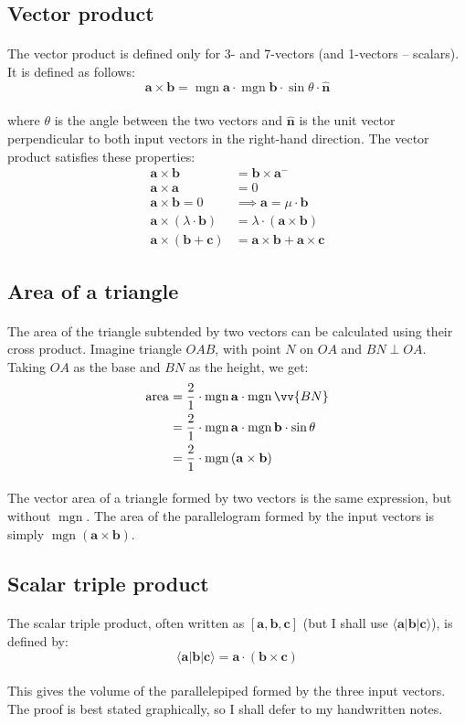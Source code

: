\documentclass[11pt]{article}
\newcommand*\cd{\cdot}
\newcommand*\prg{\paragraph}
\DeclareMathOperator{\mgn}{mgn}
\begin{document}
\subsection{Vector product}
\prg{}The vector product is defined only for 3- and 7-vectors (and 1-vectors -- scalars). It is defined as follows:
\[
\mathbf a\times\mathbf b=\mgn{\mathbf a}\cd\mgn{\mathbf b}\cd\sin\theta\cd\mathbf{\hat n}
\]
\prg{}where $\theta$ is the angle between the two vectors and $\mathbf{\hat n}$ is the unit vector perpendicular to both input vectors in the right-hand direction. The vector product satisfies these properties:
\[
\begin{aligned}
\mathbf a\times\mathbf b&=\mathbf b\times\mathbf a^-\\
\mathbf a\times\mathbf a&=0\\
\mathbf a\times\mathbf b=0&\implies\mathbf a=\mu\cd\mathbf b\\
\mathbf a\times(\lambda\cd\mathbf b)&=\lambda\cd(\mathbf a\times\mathbf b)\\
\mathbf a\times(\mathbf b+\mathbf c)&=\mathbf a\times\mathbf b+\mathbf a\times\mathbf c
\end{aligned}
\]

\subsection{Area of a triangle}
\prg{}The area of the triangle subtended by two vectors can be calculated using their cross product. Imagine triangle $OAB$, with point $N$ on $OA$ and $BN\perp OA$. Taking $OA$ as the base and $BN$ as the height, we get:
\[
\begin{aligned}
\mathrm{area}&=\frac 21\cd\mgn{\mathbf a}\cd\mgn{\vv{BN}}\\
&=\frac 21\cd\mgn{\mathbf a}\cd\mgn{\mathbf b}\cd\sin\theta\\
&=\frac 21\cd\mgn{(\mathbf a\times\mathbf b)}\\
\end{aligned}
\]
\prg{}The vector area of a triangle formed by two vectors is the same expression, but without $\mgn$. The area of the parallelogram formed by the input vectors is simply $\mgn{(\mathbf a\times\mathbf b)}$.

\subsection{Scalar triple product}
\prg{}The scalar triple product, often written as $[\mathbf a,\mathbf b,\mathbf c]$ (but I shall use $\langle\mathbf a|\mathbf b|\mathbf c\rangle$), is defined by:
\[
\langle\mathbf a|\mathbf b|\mathbf c\rangle=\mathbf a\cd(\mathbf b\times\mathbf c)
\]
\prg{}This gives the volume of the parallelepiped formed by the three input vectors. The proof is best stated graphically, so I shall defer to my handwritten notes.
\end{document}
